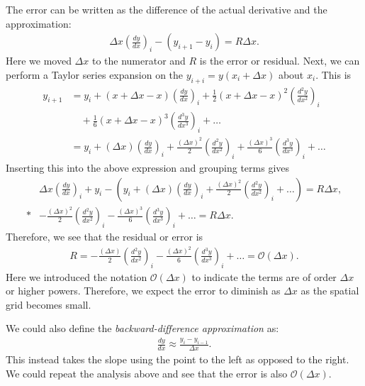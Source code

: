 The error can be written as the difference of the actual derivative and the approximation:
\begin{align}
  \Delta x  \left( \frac{dy}{dx} \right)_i - \left( y_{i+1} - y_i \right) = R \Delta x .
\end{align}
Here we moved $\Delta x$ to the numerator and $R$ is the error or residual. Next, we can perform a Taylor series expansion on the $y_{i+i} = y(x_i + \Delta x)$ about $x_i$. This is
\begin{align}
  y_{i+1} &= y_i + ( x + \Delta x - x ) \left( \frac{dy}{dx} \right)_i + \frac{1}{2} ( x + \Delta x - x )^2 \left( \frac{d^2 y}{dx^2} \right)_i \nonumber \\ &\quad +
             \frac{1}{6} ( x + \Delta x - x )^3 \left( \frac{d^3 y}{dx^3} \right)_i + \ldots \nonumber \\
          &= y_i + (\Delta x) \left( \frac{dy}{dx} \right)_i + \frac{(\Delta x)^2}{2} \left( \frac{d^2 y}{dx^2} \right)_i +
             \frac{(\Delta x)^3}{6} \left( \frac{d^3 y}{dx^3} \right)_i + \ldots
\end{align}
Inserting this into the above expression and grouping terms gives 
\begin{align}
   &\Delta x  \left( \frac{dy}{dx} \right)_i + y_i  - \left(  y_i + (\Delta x) \left( \frac{dy}{dx} \right)_i + \frac{(\Delta x)^2}{2} \left( \frac{d^2 y}{dx^2} \right)_i +
             \ldots \right) = R \Delta x , \nonumber \\*
   & -\frac{(\Delta x)^2}{2} \left( \frac{d^2 y}{dx^2} \right)_i - \frac{(\Delta x)^3}{6} \left( \frac{d^3 y}{dx^3} \right)_i + \ldots = R \Delta x .
\end{align}
Therefore, we see that the residual or error is
\begin{align}
  R = -\frac{(\Delta x)}{2} \left( \frac{d^2 y}{dx^2} \right)_i - \frac{(\Delta x)^2}{6} \left( \frac{d^3 y}{dx^3} \right)_i + \ldots = \mathcal{O}( \Delta x ) .
\end{align}
Here we introduced the notation $\mathcal{O}( \Delta x )$ to indicate the terms are of order $\Delta x$ or higher powers. Therefore, we expect the error to diminish as $\Delta x$ as the spatial grid becomes small.

We could also define the \emph{backward-difference approximation} as:
\begin{align}
  \frac{dy}{dx} \approx \frac{ y_{i} - y_{i-1} }{ \Delta x } .
\end{align}
This instead takes the slope using the point to the left as opposed to the right. We could repeat the analysis above and see that the error is also $\mathcal{O}(\Delta x)$.

